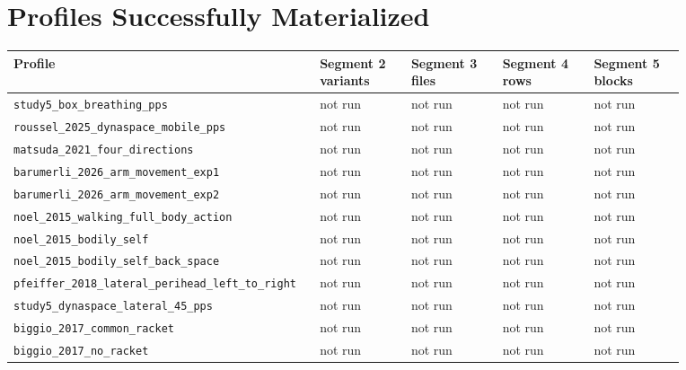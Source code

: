 \documentclass[11pt]{article}
\begin{document}
\section*{Profiles Successfully Materialized}
{\small
\begin{longtable}{>{\raggedright\arraybackslash}p{0.35\linewidth}p{0.13\linewidth}p{0.13\linewidth}p{0.13\linewidth}p{0.13\linewidth}}
\toprule
Profile & Segment 2 variants & Segment 3 files & Segment 4 rows & Segment 5 blocks \\
\midrule
\endhead
\texttt{study5\_\allowbreak{}box\_\allowbreak{}breathing\_\allowbreak{}pps} & not run & not run & not run & not run \\
\texttt{roussel\_\allowbreak{}2025\_\allowbreak{}dynaspace\_\allowbreak{}mobile\_\allowbreak{}pps} & not run & not run & not run & not run \\
\texttt{matsuda\_\allowbreak{}2021\_\allowbreak{}four\_\allowbreak{}directions} & not run & not run & not run & not run \\
\texttt{barumerli\_\allowbreak{}2026\_\allowbreak{}arm\_\allowbreak{}movement\_\allowbreak{}exp1} & not run & not run & not run & not run \\
\texttt{barumerli\_\allowbreak{}2026\_\allowbreak{}arm\_\allowbreak{}movement\_\allowbreak{}exp2} & not run & not run & not run & not run \\
\texttt{noel\_\allowbreak{}2015\_\allowbreak{}walking\_\allowbreak{}full\_\allowbreak{}body\_\allowbreak{}action} & not run & not run & not run & not run \\
\texttt{noel\_\allowbreak{}2015\_\allowbreak{}bodily\_\allowbreak{}self} & not run & not run & not run & not run \\
\texttt{noel\_\allowbreak{}2015\_\allowbreak{}bodily\_\allowbreak{}self\_\allowbreak{}back\_\allowbreak{}space} & not run & not run & not run & not run \\
\texttt{pfeiffer\_\allowbreak{}2018\_\allowbreak{}lateral\_\allowbreak{}perihead\_\allowbreak{}left\_\allowbreak{}to\_\allowbreak{}right} & not run & not run & not run & not run \\
\texttt{study5\_\allowbreak{}dynaspace\_\allowbreak{}lateral\_\allowbreak{}45\_\allowbreak{}pps} & not run & not run & not run & not run \\
\texttt{biggio\_\allowbreak{}2017\_\allowbreak{}common\_\allowbreak{}racket} & not run & not run & not run & not run \\
\texttt{biggio\_\allowbreak{}2017\_\allowbreak{}no\_\allowbreak{}racket} & not run & not run & not run & not run \\

\end{longtable}}
\end{document}
